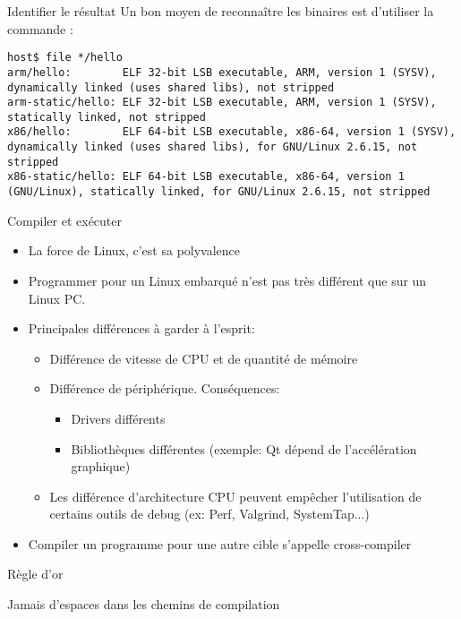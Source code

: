 \begin{frame}[fragile=singleslide]{Identifier le résultat}
  Un bon moyen de reconnaître  les binaires est d'utiliser la commande
  :
\begin{lstlisting}
host$ file */hello
arm/hello:        ELF 32-bit LSB executable, ARM, version 1 (SYSV), dynamically linked (uses shared libs), not stripped
arm-static/hello: ELF 32-bit LSB executable, ARM, version 1 (SYSV), statically linked, not stripped
x86/hello:        ELF 64-bit LSB executable, x86-64, version 1 (SYSV), dynamically linked (uses shared libs), for GNU/Linux 2.6.15, not stripped
x86-static/hello: ELF 64-bit LSB executable, x86-64, version 1 (GNU/Linux), statically linked, for GNU/Linux 2.6.15, not stripped
\end{lstlisting} %
\end{frame}

\begin{frame}{Compiler et exécuter}
  \begin{itemize}
  \item La force de Linux, c'est sa polyvalence
  \item Programmer  pour un Linux  embarqué n'est pas  très différent
    que sur un Linux PC.
  \item Principales différences à garder à l'esprit:
    \begin{itemize}
    \item Différence de vitesse de CPU et de quantité de mémoire
    \item Différence de périphérique. Conséquences:
      \begin{itemize}
      \item Drivers différents
      \item   Bibliothèques   différentes   (exemple:  Qt   dépend   de
        l'accélération graphique)
      \end{itemize}
    \item   Les  différence   d'architecture   CPU  peuvent   empêcher
      l'utilisation de  certains outils de debug  (ex: Perf, Valgrind,
      SystemTap...)
    \end{itemize}
  \item  Compiler   un  programme  pour  une   autre  cible  s'appelle
    cross-compiler
  \end{itemize}
\end{frame}

\begin{frame}[fragile=singleslide]{Règle d'or}
  \begin{center}
    \huge{Jamais d'espaces dans les chemins de compilation}
  \end{center}
\end{frame}

